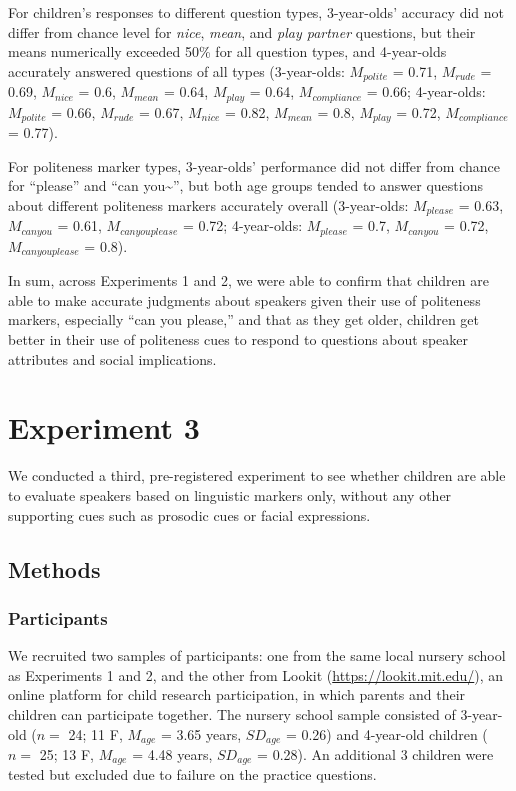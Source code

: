 \documentclass[10pt, letterpaper]{article}
\begin{document}
For children's responses to different question types, 3-year-olds'
accuracy did not differ from chance level for \emph{nice}, \emph{mean},
and \emph{play partner} questions, but their means numerically exceeded
50\% for all question types, and 4-year-olds accurately answered
questions of all types (3-year-olds: \(M_{polite}\) = 0.71, \(M_{rude}\)
= 0.69, \(M_{nice}\) = 0.6, \(M_{mean}\) = 0.64, \(M_{play}\) = 0.64,
\(M_{compliance}\) = 0.66; 4-year-olds: \(M_{polite}\) = 0.66,
\(M_{rude}\) = 0.67, \(M_{nice}\) = 0.82, \(M_{mean}\) = 0.8,
\(M_{play}\) = 0.72, \(M_{compliance}\) = 0.77).

For politeness marker types, 3-year-olds' performance did not differ
from chance for ``please'' and ``can you\textasciitilde{}'', but both
age groups tended to answer questions about different politeness markers
accurately overall (3-year-olds: \(M_{please}\) = 0.63, \(M_{can you}\)
= 0.61, \(M_{can you please}\) = 0.72; 4-year-olds: \(M_{please}\) =
0.7, \(M_{can you}\) = 0.72, \(M_{can you please}\) = 0.8).

In sum, across Experiments 1 and 2, we were able to confirm that
children are able to make accurate judgments about speakers given their
use of politeness markers, especially ``can you please,'' and that as
they get older, children get better in their use of politeness cues to
respond to questions about speaker attributes and social implications.

\section{Experiment 3}\label{experiment-3}

We conducted a third, pre-registered experiment to see whether children
are able to evaluate speakers based on linguistic markers only, without
any other supporting cues such as prosodic cues or facial expressions.

\subsection{Methods}\label{methods-1}

\subsubsection{Participants}\label{participants-2}

We recruited two samples of participants: one from the same local
nursery school as Experiments 1 and 2, and the other from Lookit
(\url{https://lookit.mit.edu/}), an online platform for child research
participation, in which parents and their children can participate
together. The nursery school sample consisted of 3-year-old (\(n=\) 24;
11 F, \(M_{age}\) = 3.65 years, \(SD_{age}\) = 0.26) and 4-year-old
children (\(n=\) 25; 13 F, \(M_{age}\) = 4.48 years, \(SD_{age}\) =
0.28). An additional 3 children were tested but excluded due to failure
on the practice questions.
\end{document}
